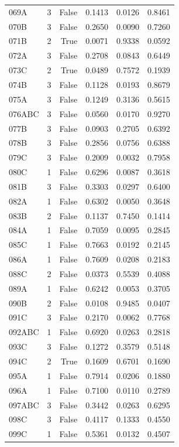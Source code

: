 \begin{longtable}{lrrrrr}
  069A & 3 & False & 0.1413 & 0.0126 & 0.8461 \\
  070B & 3 & False & 0.2650 & 0.0090 & 0.7260 \\
  071B & 2 & True & 0.0071 & 0.9338 & 0.0592 \\
  072A & 3 & False & 0.2708 & 0.0843 & 0.6449 \\
  073C & 2 & True & 0.0489 & 0.7572 & 0.1939 \\
  074B & 3 & False & 0.1128 & 0.0193 & 0.8679 \\
  075A & 3 & False & 0.1249 & 0.3136 & 0.5615 \\
  076ABC & 3 & False & 0.0560 & 0.0170 & 0.9270 \\
  077B & 3 & False & 0.0903 & 0.2705 & 0.6392 \\
  078B & 3 & False & 0.2856 & 0.0756 & 0.6388 \\
  079C & 3 & False & 0.2009 & 0.0032 & 0.7958 \\
  080C & 1 & False & 0.6296 & 0.0087 & 0.3618 \\
  081B & 3 & False & 0.3303 & 0.0297 & 0.6400 \\
  082A & 1 & False & 0.6302 & 0.0050 & 0.3648 \\
  083B & 2 & False & 0.1137 & 0.7450 & 0.1414 \\
  084A & 1 & False & 0.7059 & 0.0095 & 0.2845 \\
  085C & 1 & False & 0.7663 & 0.0192 & 0.2145 \\
  086A & 1 & False & 0.7609 & 0.0208 & 0.2183 \\
  088C & 2 & False & 0.0373 & 0.5539 & 0.4088 \\
  089A & 1 & False & 0.6242 & 0.0053 & 0.3705 \\
  090B & 2 & False & 0.0108 & 0.9485 & 0.0407 \\
  091C & 3 & False & 0.2170 & 0.0062 & 0.7768 \\
  092ABC & 1 & False & 0.6920 & 0.0263 & 0.2818 \\
  093C & 3 & False & 0.1272 & 0.3579 & 0.5148 \\
  094C & 2 & True & 0.1609 & 0.6701 & 0.1690 \\
  095A & 1 & False & 0.7914 & 0.0206 & 0.1880 \\
  096A & 1 & False & 0.7100 & 0.0110 & 0.2789 \\
  097ABC & 3 & False & 0.3442 & 0.0263 & 0.6295 \\
  098C & 3 & False & 0.4117 & 0.1333 & 0.4550 \\
  099C & 1 & False & 0.5361 & 0.0132 & 0.4507 \\

\end{longtable}
